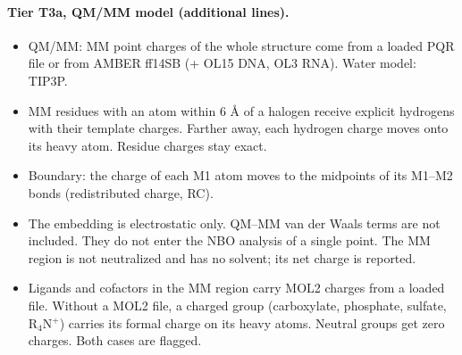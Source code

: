 \documentclass[journal=jcisd8,manuscript=suppinfo]{achemso}
\begin{document}
\begin{singlespace}
\paragraph{Tier T3a, QM/MM model (additional lines).}
\begin{itemize}[nosep,leftmargin=*]
\item QM/MM: MM point charges of the whole structure come from a loaded PQR file or from AMBER ff14SB (+ OL15 DNA, OL3 RNA). Water model: TIP3P.
\item MM residues with an atom within 6 \AA{} of a halogen receive explicit hydrogens with their template charges. Farther away, each hydrogen charge moves onto its heavy atom. Residue charges stay exact.
\item Boundary: the charge of each M1 atom moves to the midpoints of its M1--M2 bonds (redistributed charge, RC).
\item The embedding is electrostatic only. QM--MM van der Waals terms are not included. They do not enter the NBO analysis of a single point. The MM region is not neutralized and has no solvent; its net charge is reported.
\item Ligands and cofactors in the MM region carry MOL2 charges from a loaded file. Without a MOL2 file, a charged group (carboxylate, phosphate, sulfate, R$_4$N$^+$) carries its formal charge on its heavy atoms. Neutral groups get zero charges. Both cases are flagged.
\end{itemize}

\end{singlespace}
\end{document}

